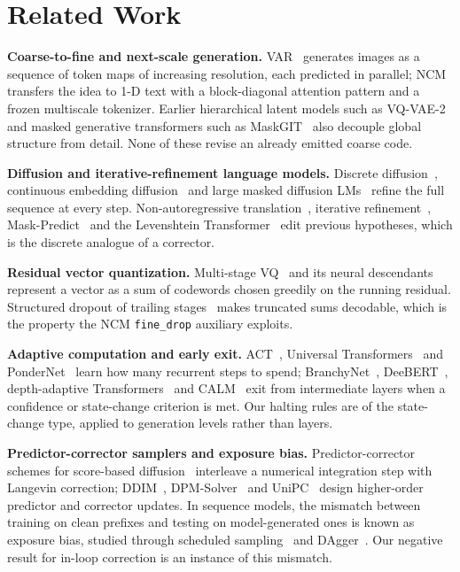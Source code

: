 \section{Related Work}
\textbf{Coarse-to-fine and next-scale generation.} VAR~\citep{tian2024var} generates images as a sequence of token maps of increasing resolution, each predicted in parallel; NCM~\citep{kumbong2026ncm} transfers the idea to 1-D text with a block-diagonal attention pattern and a frozen multiscale tokenizer. Earlier hierarchical latent models such as VQ-VAE-2~\citep{razavi2019vqvae2} and masked generative transformers such as MaskGIT~\citep{chang2022maskgit} also decouple global structure from detail. None of these revise an already emitted coarse code.

\textbf{Diffusion and iterative-refinement language models.} Discrete diffusion~\citep{austin2021d3pm,campbell2022ctmc,lou2024sedd,sahoo2024mdlm,shi2024md4}, continuous embedding diffusion~\citep{li2022diffusionlm,gulrajani2023plaid} and large masked diffusion LMs~\citep{nie2025llada} refine the full sequence at every step. Non-autoregressive translation~\citep{gu2018nat}, iterative refinement~\citep{lee2018deterministic}, Mask-Predict~\citep{ghazvininejad2019maskpredict} and the Levenshtein Transformer~\citep{gu2019levenshtein} edit previous hypotheses, which is the discrete analogue of a corrector.

\textbf{Residual vector quantization.} Multi-stage VQ~\citep{juang1982multiple} and its neural descendants~\citep{vandenoord2017vqvae,lee2022rqvae,zeghidour2022soundstream,defossez2023encodec} represent a vector as a sum of codewords chosen greedily on the running residual. Structured dropout of trailing stages~\citep{rippel2014nested,zeghidour2022soundstream} makes truncated sums decodable, which is the property the NCM \texttt{fine\_drop} auxiliary exploits.

\textbf{Adaptive computation and early exit.} ACT~\citep{graves2016act}, Universal Transformers~\citep{dehghani2019universal} and PonderNet~\citep{banino2021pondernet} learn how many recurrent steps to spend; BranchyNet~\citep{teerapittayanon2016branchynet}, DeeBERT~\citep{xin2020deebert}, depth-adaptive Transformers~\citep{elbayad2020depth} and CALM~\citep{schuster2022calm} exit from intermediate layers when a confidence or state-change criterion is met. Our halting rules are of the state-change type, applied to generation levels rather than layers.

\textbf{Predictor-corrector samplers and exposure bias.} Predictor-corrector schemes for score-based diffusion~\citep{ho2020ddpm,song2021sde} interleave a numerical integration step with Langevin correction; DDIM~\citep{song2021ddim}, DPM-Solver~\citep{lu2022dpmsolver} and UniPC~\citep{zhao2023unipc} design higher-order predictor and corrector updates. In sequence models, the mismatch between training on clean prefixes and testing on model-generated ones is known as exposure bias, studied through scheduled sampling~\citep{bengio2015scheduled} and DAgger~\citep{ross2011dagger}. Our negative result for in-loop correction is an instance of this mismatch.


